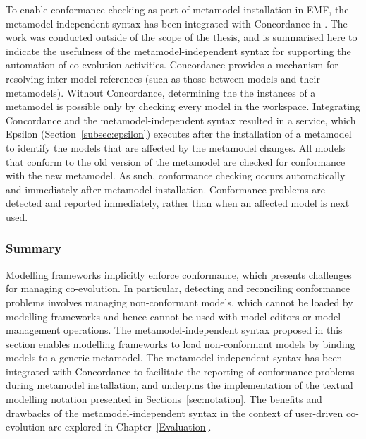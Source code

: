 
To enable conformance checking as part of metamodel installation in EMF, the metamodel-independent syntax has been integrated with Concordance in \cite{rose10concordance}. The work was conducted outside of the scope of the thesis, and is summarised here to indicate the usefulness of the metamodel-independent syntax for supporting the automation of co-evolution activities. Concordance provides a mechanism for resolving inter-model references (such as those between models and their metamodels). Without Concordance, determining the the instances of a metamodel is possible only by checking every model in the workspace. Integrating Concordance and the metamodel-independent syntax resulted in a service, which Epsilon (Section~\ref{subsec:epsilon}) executes after the installation of a metamodel to identify the models that are affected by the metamodel changes. All models that conform to the old version of the metamodel are checked for conformance with the new metamodel. As such, conformance checking occurs automatically and immediately after metamodel installation. Conformance problems are detected and reported immediately, rather than when an affected model is next used.

\subsubsection{Summary}
Modelling frameworks implicitly enforce conformance, which presents challenges for managing co-evolution. In particular, detecting and reconciling conformance problems involves managing non-conformant models, which cannot be loaded by modelling frameworks and hence cannot be used with model editors or model management operations. The metamodel-independent syntax proposed in this section enables modelling frameworks to load non-conformant models by binding models to a generic metamodel. The metamodel-independent syntax has been integrated with Concordance \cite{rose10concordance} to facilitate the reporting of conformance problems during metamodel installation, and underpins the implementation of the textual modelling notation presented in Sections~\ref{sec:notation}. The benefits and drawbacks of the metamodel-independent syntax in the context of user-driven co-evolution are explored in Chapter~\ref{Evaluation}. 
